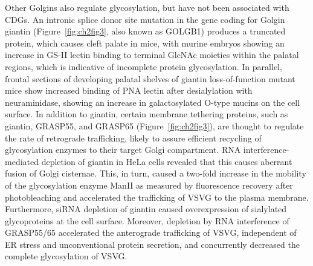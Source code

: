 Other Golgins also regulate glycosylation, but have not been associated with CDGs. An intronic splice donor site mutation in the gene coding for Golgin giantin (Figure~\ref{fig:ch2fig3}, also known as GOLGB1) produces a truncated protein, which causes cleft palate in mice, with murine embryos showing an increase in GS-II lectin binding to terminal GlcNAc moieties within the palatal regions, which is indicative of incomplete protein glycosylation. In parallel, frontal sections of developing palatal shelves of giantin loss-of-function mutant mice show increased binding of PNA lectin after desialylation with neuraminidase, showing an increase in galactosylated O-type mucins on the cell surface\cite{lan_golgb1_2016}. In addition to giantin, certain membrane tethering proteins, such as giantin, GRASP55, and GRASP65 (Figure~\ref{fig:ch2fig3}), are thought to regulate the rate of retrograde trafficking, likely to assure efficient recycling of glycosylation enzymes to their target Golgi compartment. RNA interference-mediated depletion of giantin in HeLa cells revealed that this causes aberrant fusion of Golgi cisternae\cite{satoh_golgin_2019}. This, in turn, caused a two-fold increase in the mobility of the glycosylation enzyme ManII as measured by fluorescence recovery after photobleaching and accelerated the trafficking of VSVG to the plasma membrane\cite{koreishi_golgin_2013}. Furthermore, siRNA depletion of giantin caused overexpression of sialylated glycoproteins at the cell surface\cite{koreishi_golgin_2013}. Moreover, depletion by RNA interference of GRASP55/65 accelerated the anterograde trafficking of VSVG, independent of ER stress and unconventional protein secretion, and concurrently decreased the complete glycosylation of VSVG\cite{xiang_regulation_2013}.

